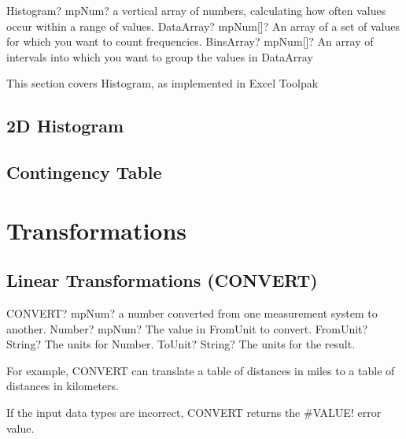 \vspace{0.6cm}
\begin{mpFunctionsExtract}
	\mpWorksheetFunctionTwoNotImplemented
	{Histogram? mpNum? a vertical array of numbers, calculating how often values occur within a range of values.}
	{DataArray? mpNum[]? An array of a set of values for which you want to count frequencies.}
	{BinsArray? mpNum[]? An array of intervals into which you want to group the values in \textsf{DataArray}}
\end{mpFunctionsExtract}



\vspace{0.3cm}
This section covers Histogram, as implemented in Excel Toolpak

\subsection{2D Histogram}
\lipsum[2]

\subsection{Contingency Table}
\lipsum[2]



\newpage
\section{Transformations}
\lipsum[1]



\subsection{Linear Transformations (CONVERT)}

\begin{mpFunctionsExtract}
	\mpWorksheetFunctionThreeNotImplemented
	{CONVERT? mpNum? a number converted from one measurement system to another.}
	{Number? mpNum? The value in \textsf{FromUnit} to convert.}
	{FromUnit? String? The units for \textsf{Number}.}
	{ToUnit? String? The units for the result.}
\end{mpFunctionsExtract}

\vspace{0.3cm}
For example, \textsf{CONVERT} can translate a table of distances in miles to a table of distances in kilometers.

If the input data types are incorrect, \textsf{CONVERT} returns the \#VALUE! error value.


